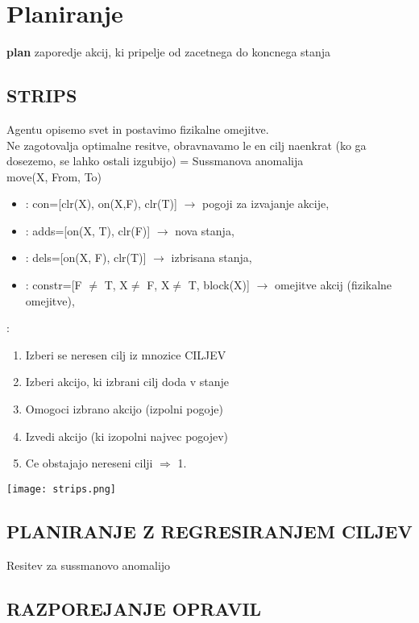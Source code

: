 \section{Planiranje}

\textbf{plan} zaporedje akcij, ki pripelje od zacetnega do koncnega stanja

\subsection{STRIPS}
Agentu opisemo svet in postavimo fizikalne omejitve.\\
Ne zagotovalja optimalne resitve, obravnavamo le en cilj naenkrat (ko ga dosezemo, se lahko ostali izgubijo) = Sussmanova anomalija\\
 move(X, From, To)
\begin{itemize}[noitemsep,topsep=0pt,leftmargin=*]
    \item {}: con=[clr(X), on(X,F), clr(T)] $\rightarrow$ pogoji za izvajanje akcije,
    \item {}: adds=[on(X, T), clr(F)] $\rightarrow$ nova stanja,
    \item {}: dels=[on(X, F), clr(T)] $\rightarrow$ izbrisana stanja,
    \item {}: constr=[F $\neq$ T, X$\neq$ F, X$\neq$ T, block(X)] $\rightarrow$ omejitve akcij (fizikalne omejitve),
\end{itemize}
:
\begin{enumerate}[noitemsep,topsep=0pt,leftmargin=*]
    \item Izberi se neresen cilj iz mnozice CILJEV
    \item Izberi akcijo, ki izbrani cilj doda v stanje
    \item Omogoci izbrano akcijo (izpolni pogoje)
    \item Izvedi akcijo (ki izopolni najvec pogojev)
    \item Ce obstajajo nereseni cilji $\Rightarrow$ 1.
\end{enumerate}

\texttt{[image: strips.png]}



\subsection{PLANIRANJE Z REGRESIRANJEM CILJEV}
Resitev za sussmanovo anomalijo

\subsection{RAZPOREJANJE OPRAVIL}

